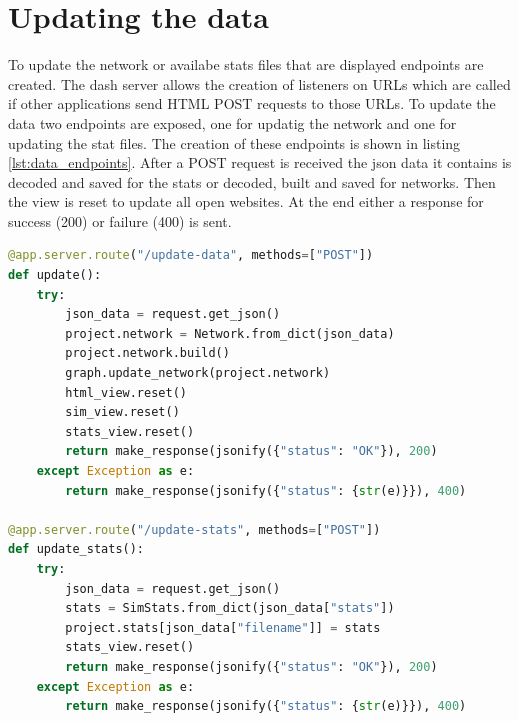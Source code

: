 \section{Updating the data}
To update the network or availabe stats files that are displayed endpoints are created.
The dash server allows the creation of listeners on URLs which are called if other
applications send HTML POST requests to those URLs. To update the data two endpoints
are exposed, one for updatig the network and one for updating the stat files.
The creation of these endpoints is shown in listing \ref{lst:data_endpoints}.
After a POST request is received the json data it contains is decoded and saved
for the stats or decoded, built and saved for networks. Then the view is reset to update
all open websites. At the end either a response for success (200) or failure (400) is sent.

\begin{lstlisting}[language=python, caption={Endpoints for updating data}, label={lst:data_endpoints}]
@app.server.route("/update-data", methods=["POST"])
def update():
    try:
        json_data = request.get_json()
        project.network = Network.from_dict(json_data)
        project.network.build()
        graph.update_network(project.network)
        html_view.reset()
        sim_view.reset()
        stats_view.reset()
        return make_response(jsonify({"status": "OK"}), 200)
    except Exception as e:
        return make_response(jsonify({"status": {str(e)}}), 400)

@app.server.route("/update-stats", methods=["POST"])
def update_stats():
    try:
        json_data = request.get_json()
        stats = SimStats.from_dict(json_data["stats"])
        project.stats[json_data["filename"]] = stats
        stats_view.reset()
        return make_response(jsonify({"status": "OK"}), 200)
    except Exception as e:
        return make_response(jsonify({"status": {str(e)}}), 400)
\end{lstlisting}

